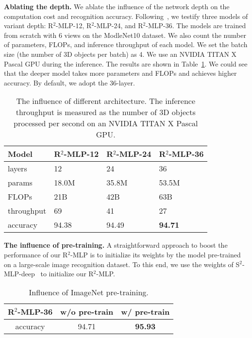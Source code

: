\documentclass[11pt]{article}
\begin{document}
\vspace{0.2in}\noindent\textbf{Ablating the depth.}
We ablate the influence of the network depth on the computation cost and recognition accuracy. Following~\citep{yu2022s2mlp}, we testify three models of variant depth: R$^2$-MLP-12, R$^2$-MLP-24, and R$^2$-MLP-36.
The models are trained from scratch with 6 views on the ModleNet10 dataset. We also count the number of parameters, FLOPs, and inference throughput of each model. We set the batch size (the number of 3D objects per batch) as 4. We use an NVIDIA TITAN X Pascal GPU during the inference. The results are shown in Table~\ref{tab:arch}. We could see that the deeper model takes more parameters and FLOPs and achieves higher accuracy. By default, we adopt the $36$-layer.

\begin{table}[h]
\caption{The influence of different architecture. The inference throughput is measured as the number of 3D objects processed per second on an NVIDIA TITAN X Pascal GPU.}\label{tab:arch}
\centering
\begin{tabular}{llll}
\toprule
Model & R$^2$-MLP-12 & R$^2$-MLP-24 & R$^2$-MLP-36 \\
\midrule
layers & 12 & 24 & 36 \\
params & 18.0M & 35.8M & 53.5M \\
FLOPs & 21B & 42B & 63B \\
throughput & 69 & 41 & 27 \\
accuracy & 94.38 & 94.49 & \textbf{94.71} \\
\bottomrule
\end{tabular}
\end{table}


\vspace{0.1in}\noindent\textbf{The influence of pre-training.}
A straightforward approach to boost the performance of our R$^2$-MLP is to initialize its weights by the model pre-trained on a large-scale image recognition dataset. To this end, we use the weights of S$^2$-MLP-deep~\citep{yu2022s2mlp} to initialize our R$^2$-MLP.


\begin{table}[htb!]
\caption{Influence of ImageNet pre-training.}
\label{tab:pretrain}\centering
\begin{tabular}{ccc}
\toprule
R$^2$-MLP-36 & w/o pre-train & w/ pre-train \\
\midrule
accuracy & 94.71 & \textbf{95.93} \\
\bottomrule
\end{tabular}
\end{table}
\end{document}
